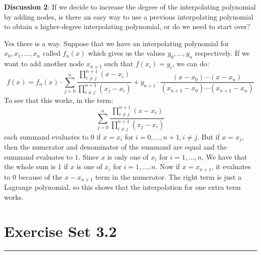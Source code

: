 \documentclass{article}
\begin{document}
\textbf{Discussion 2}: If we decide to increase the degree of the interpolating polynomial by adding nodes, is there an easy way to use a previous interpolating polynomial to obtain a higher-degree interpolating polynomial, or do we need to start over?
    \begin{answer}
        Yes there is a way. Suppose that we have an interpolating polynomial for $x_{0}, x_{1}, \ldots, x_{n}$ called $f_{n}(x)$ which gives us the values $y_{0}, \ldots, y_{n}$ respectively. If we want to add another node $x_{n + 1}$ such that $f(x_{i}) = y_{i}$, we can do:
            \begin{equation*}
                f(x) = f_{n}(x) \cdot \sum_{j = 0}^{n}\dfrac{\prod_{i \neq j}^{n + 1}(x - x_{i})}{\prod_{i \neq j}^{n + 1}(x_{j} - x_{i})} + y_{n + 1} \cdot \dfrac{(x - x_{0}) \cdots (x - x_{n})}{(x_{n + 1} - x_{0}) \cdots (x_{n + 1} - x_{n})}
            \end{equation*}
        To see that this works, in the term:
            \begin{equation*}
                \sum_{j = 0}^{n} \dfrac{\prod_{i \neq j}^{n + 1}(x - x_{i})}{\prod_{i \neq j}^{n + 1}(x_{j} - x_{i})}
            \end{equation*}
        each summand evaluates to $0$ if $x = x_{i}$ for $i = 0, \ldots, n + 1, i \neq j$. But if $x = x_{j}$, then the numerator and denominator of the summand are equal and the summand evaluates to $1$. Since $x$ is only one of $x_{i}$ for $i = 1, \ldots, n$, We have that the whole sum is $1$ if $x$ is one of $x_{i}$ for $i = 1, \ldots, n$. Now if $x = x_{n + 1}$, it evaluates to $0$ because of the $x - x_{n + 1}$ term in the numerator. The right term is just a Lagrange polynomial, so this shows that the interpolation for one extra term works.
    \end{answer}

\newpage
\section*{Exercise Set 3.2}
\hrule
\end{document}
